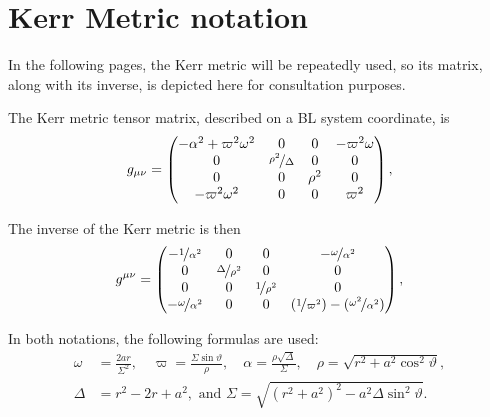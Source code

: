 \section{Kerr Metric notation}

In the following pages, the Kerr metric will be repeatedly used, so its matrix, along with its inverse, is depicted here for consultation purposes.

The Kerr metric tensor matrix, described on a \ac{BL} system coordinate, is
\[
	g_{\mu\nu} = \begin{pmatrix}
		-\alpha^2 + \varpi^2\omega^2 & 0 & 0 & -\varpi^2\omega \\
		0 & \nicefrac{\rho^2}{\Delta} & 0 & 0 \\
		0 & 0 & \rho^2 & 0 \\
		-\varpi^2\omega^2 & 0 & 0 & \varpi^2
	\end{pmatrix},
\]

The inverse of the Kerr metric is then
\[
	g^{\mu\nu} = \begin{pmatrix}
		-\nicefrac{1}{\alpha^2} & 0 & 0 & -\nicefrac{\omega}{\alpha^2} \\
		0 & \nicefrac{\Delta}{\rho^2} & 0 & 0 \\
		0 & 0 & \nicefrac{1}{\rho^2} & 0 \\
		-\nicefrac{\omega}{\alpha^2} & 0 & 0 & (\nicefrac{1}{\varpi^2}) - (\nicefrac{\omega^2}{\alpha^2})
	\end{pmatrix},
\]


In both notations, the following formulas are used:
\begin{align}
	\omega &= \frac{2ar}{\Sigma^2},  \quad \varpi = \frac{\Sigma\sin\vartheta}{\rho}, \quad \alpha = \frac{\rho\sqrt{\Delta}}{\Sigma}, \quad \rho = \sqrt{r^2 + a^2\cos^2\vartheta},\nonumber\\
	\Delta &= r^2 - 2r + a^2, \textrm{ and } \Sigma = \sqrt{(r^2+a^2)^2 - a^2\Delta\sin^2\vartheta}.
	\label{eq:termdef}
\end{align}